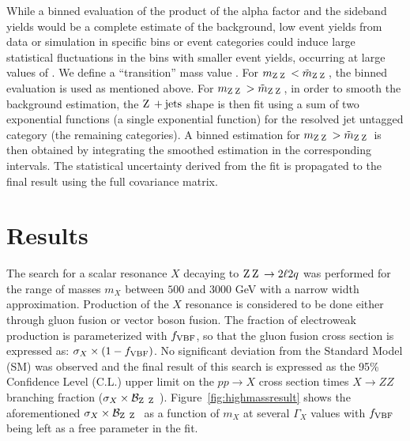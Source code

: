  While a binned evaluation of the product of the alpha factor and the sideband yields would
 be a complete estimate of the background, low event yields from data or simulation in specific
 bins or event categories could induce large statistical fluctuations
 in the bins with smaller event yields, occurring at large values of \mZZ.
 We define a ``transition'' mass value \mZZtilde. For $m_{\mathrm{Z}\hspace{0.2em}\mathrm{Z}\hspace{0.2em}} < \tilde{m}_{\mathrm{Z}\hspace{0.2em}\mathrm{Z}\hspace{0.2em}}$, the
 binned evaluation is used as mentioned above. For $m_{\mathrm{Z}\hspace{0.2em}\mathrm{Z}\hspace{0.2em}} > \tilde{m}_{\mathrm{Z}\hspace{0.2em}\mathrm{Z}\hspace{0.2em}}$,
 in order to smooth the background estimation, the $\mathrm{Z}\hspace{0.2em} + \text{jets}$ shape is then fit using a sum of two exponential functions (a single exponential function) for the resolved jet untagged category (the remaining categories). A binned estimation
 for $m_{\mathrm{Z}\hspace{0.2em}\mathrm{Z}\hspace{0.2em}} > \tilde{m}_{\mathrm{Z}\hspace{0.2em}\mathrm{Z}\hspace{0.2em}}$ is then obtained by integrating the smoothed
 estimation in the corresponding intervals. The statistical uncertainty derived from the fit is propagated to the final result using the full covariance matrix.

 \section{Results}
 \label{sec:Results}

 The search for a scalar resonance $X$ decaying to $\mathrm{Z}\hspace{0.2em} \mathrm{Z}\hspace{0.2em}\to 2\ell2q$ was performed for the range  of masses $m_X$ between $500$ and $3000$ GeV with a narrow width approximation. Production of the $X$ resonance is considered to be done either through
 gluon fusion or vector boson fusion. The fraction of electroweak production is parameterized with $f_{\rm VBF}$, so that the gluon fusion cross section is expressed as: $\sigma_X\times (1-f_{\rm VBF})$. No significant deviation from the Standard Model (SM) was observed and the final result of this search is expressed as the 95\% Confidence Level (C.L.) upper limit on the $pp\to X$ cross section times $X\to ZZ$ branching fraction ($\sigma_X\times {\cal B}_{\Z\Z}$). Figure~\ref{fig:highmassresult} shows the aforementioned $\sigma_X\times {\cal B}_{\Z\Z}$ as a function of $m_X$ at several $\Gamma_X$ values with $f_{\rm VBF}$ being left as a free parameter in the fit.


